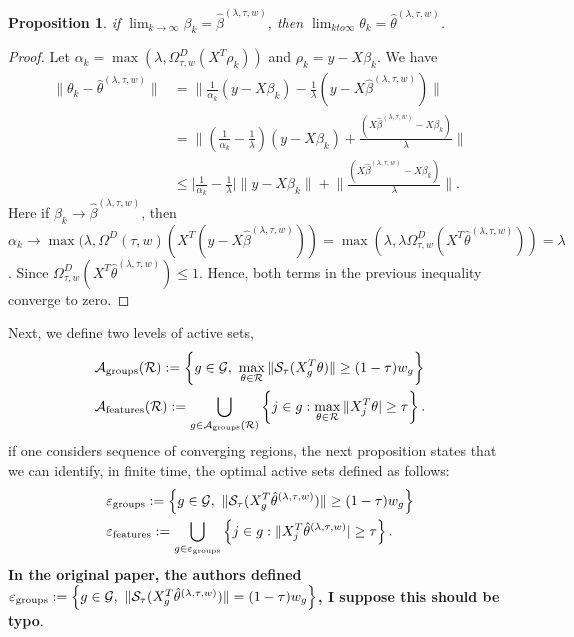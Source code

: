 \documentclass{article}
\def\cS{{\cal S}}
\def\cG{{\cal G}}
\def\ca{{\cal A}}
\def\cR{{\cal R}}
\def\cep{{\cal \varepsilon}}
\newtheorem{proposition}{Proposition}[section]
\begin{document}
\begin{proposition}
if $\lim_{k \to \infty} \beta_k = \hat{\beta}^{(\lambda,\tau,w)}$, then $\lim_{k to \infty} \theta_k = \hat{\theta}^{(\lambda,\tau,w)}$. 
\end{proposition}
\begin{proof}
Let $\alpha_k  = \max(\lambda, \Omega^D_{\tau,w}(X^T \rho_k))$ and $\rho_k = y - X\beta_k$. We have
\begin{align*}
\|\theta_k - \hat{\theta}^{(\lambda,\tau,w)}\| & = \Big\|\frac{1}{\alpha_k}(y - X\beta_k) - \frac{1}{\lambda}(y - X\hat{\beta}^{(\lambda,\tau,w)})\Big \| \\ 
& = \Big \| \left(\frac{1}{\alpha_k} - \frac{1}{\lambda}\right)(y - X \beta_k) + \frac{(X \hat{\beta}^{(\lambda,\tau,w)} - X\beta_k)}{\lambda} \Big \| \\
&  \leq \Big | \frac{1}{\alpha_k} - \frac{1}{\lambda} \Big | \|y - X\beta_k\| + \Big \| \frac{(X \hat{\beta}^{(\lambda,\tau,w)} - X\beta_k)}{\lambda} \Big \|. 
\end{align*}
Here if $\beta_k \to \hat{\beta}^{(\lambda,\tau,w)}$, then $\alpha_k \to \max(\lambda,\Omega^D(\tau,w) (X^T(y - X\hat{\beta}^{(\lambda,\tau,w)})) = \max(\lambda,\lambda \Omega^D_{\tau,w}(X^T \hat{\theta}^{(\lambda,\tau,w)})) = \lambda$.  Since $\Omega^D_{\tau,w}(X^T\hat{\theta}^{(\lambda,\tau,w)}) \leq 1$. Hence, both terms in the previous inequality converge to zero. 
\end{proof}

Next, we define two levels of active sets, 
\begin{align*}
& \ca_{\text{groups}}(\cR): = \left\{ g \in \cG, \ \max\limits_{\theta \in \cR} \|\cS_{\tau}(X_g^T\theta)\| \geq (1-\tau) w_g \right\} \\
& \ca_{\text{features}}(\cR) := \bigcup\limits_{g \in \ca_{\text{groups}}(\cR)} \left\{ j \in g: \max_{\theta \in \cR}\|X_j^T \theta| \geq \tau \right\}.
\end{align*}
if one considers sequence of converging regions, the next proposition states that we can identify, in finite time, the optimal active sets defined as follows:
\begin{align*}
& \cep_{\text{groups}}: = \left\{ g \in \cG, \  \|\cS_{\tau}(X_g^T\hat{\theta}^{(\lambda,\tau,w)})\| \geq (1-\tau) w_g \right\} \\
& \cep_{\text{features}} := \bigcup\limits_{g \in \cep_{\text{groups}}} \left\{ j \in g: \|X_j^T \hat{\theta}^{(\lambda,\tau,w)}| \geq \tau \right\}.
\end{align*}
\textbf{In the original paper, the authors defined $\cep_{\text{groups}}: = \left\{ g \in \cG, \  \|\cS_{\tau}(X_g^T\hat{\theta}^{(\lambda,\tau,w)})\| = (1-\tau) w_g \right\}$,  I suppose this should be typo}.
\end{document}
